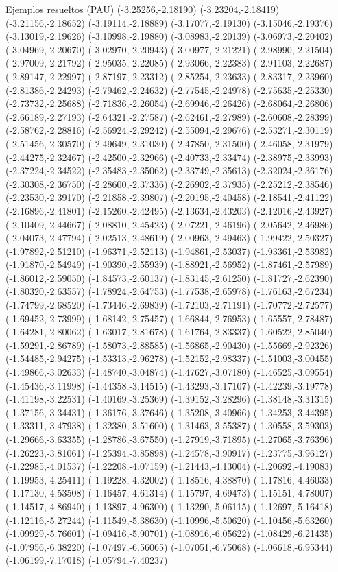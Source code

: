 \documentclass[11pt,a4paper]{article}
\begin{document}
\begin{fmex}{Ejemplos resueltos (PAU)}
(-3.25256,-2.18190) (-3.23204,-2.18419) (-3.21156,-2.18652) (-3.19114,-2.18889) (-3.17077,-2.19130) (-3.15046,-2.19376) (-3.13019,-2.19626) (-3.10998,-2.19880) (-3.08983,-2.20139) (-3.06973,-2.20402) (-3.04969,-2.20670) (-3.02970,-2.20943) (-3.00977,-2.21221) (-2.98990,-2.21504) (-2.97009,-2.21792) (-2.95035,-2.22085) (-2.93066,-2.22383) (-2.91103,-2.22687) (-2.89147,-2.22997) (-2.87197,-2.23312) (-2.85254,-2.23633) (-2.83317,-2.23960) (-2.81386,-2.24293) (-2.79462,-2.24632) (-2.77545,-2.24978) (-2.75635,-2.25330) (-2.73732,-2.25688) (-2.71836,-2.26054) (-2.69946,-2.26426) (-2.68064,-2.26806) (-2.66189,-2.27193) (-2.64321,-2.27587) (-2.62461,-2.27989) (-2.60608,-2.28399) (-2.58762,-2.28816) (-2.56924,-2.29242) (-2.55094,-2.29676) (-2.53271,-2.30119) (-2.51456,-2.30570) (-2.49649,-2.31030) (-2.47850,-2.31500) (-2.46058,-2.31979) (-2.44275,-2.32467) (-2.42500,-2.32966) (-2.40733,-2.33474) (-2.38975,-2.33993) (-2.37224,-2.34522) (-2.35483,-2.35062) (-2.33749,-2.35613) (-2.32024,-2.36176) (-2.30308,-2.36750) (-2.28600,-2.37336) (-2.26902,-2.37935) (-2.25212,-2.38546) (-2.23530,-2.39170) (-2.21858,-2.39807) (-2.20195,-2.40458) (-2.18541,-2.41122) (-2.16896,-2.41801) (-2.15260,-2.42495) (-2.13634,-2.43203) (-2.12016,-2.43927) (-2.10409,-2.44667) (-2.08810,-2.45423) (-2.07221,-2.46196) (-2.05642,-2.46986) (-2.04073,-2.47794) (-2.02513,-2.48619) (-2.00963,-2.49463) (-1.99422,-2.50327) (-1.97892,-2.51210) (-1.96371,-2.52113) (-1.94861,-2.53037) (-1.93361,-2.53982) (-1.91870,-2.54949) (-1.90390,-2.55939) (-1.88921,-2.56952) (-1.87461,-2.57989) (-1.86012,-2.59050) (-1.84573,-2.60137) (-1.83145,-2.61250) (-1.81727,-2.62390) (-1.80320,-2.63557) (-1.78924,-2.64753) (-1.77538,-2.65978) (-1.76163,-2.67234) (-1.74799,-2.68520) (-1.73446,-2.69839) (-1.72103,-2.71191) (-1.70772,-2.72577) (-1.69452,-2.73999) (-1.68142,-2.75457) (-1.66844,-2.76953) (-1.65557,-2.78487) (-1.64281,-2.80062) (-1.63017,-2.81678) (-1.61764,-2.83337) (-1.60522,-2.85040) (-1.59291,-2.86789) (-1.58073,-2.88585) (-1.56865,-2.90430) (-1.55669,-2.92326) (-1.54485,-2.94275) (-1.53313,-2.96278) (-1.52152,-2.98337) (-1.51003,-3.00455) (-1.49866,-3.02633) (-1.48740,-3.04874) (-1.47627,-3.07180) (-1.46525,-3.09554) (-1.45436,-3.11998) (-1.44358,-3.14515) (-1.43293,-3.17107) (-1.42239,-3.19778) (-1.41198,-3.22531) (-1.40169,-3.25369) (-1.39152,-3.28296) (-1.38148,-3.31315) (-1.37156,-3.34431) (-1.36176,-3.37646) (-1.35208,-3.40966) (-1.34253,-3.44395) (-1.33311,-3.47938) (-1.32380,-3.51600) (-1.31463,-3.55387) (-1.30558,-3.59303) (-1.29666,-3.63355) (-1.28786,-3.67550) (-1.27919,-3.71895) (-1.27065,-3.76396) (-1.26223,-3.81061) (-1.25394,-3.85898) (-1.24578,-3.90917) (-1.23775,-3.96127) (-1.22985,-4.01537) (-1.22208,-4.07159) (-1.21443,-4.13004) (-1.20692,-4.19083) (-1.19953,-4.25411) (-1.19228,-4.32002) (-1.18516,-4.38870) (-1.17816,-4.46033) (-1.17130,-4.53508) (-1.16457,-4.61314) (-1.15797,-4.69473) (-1.15151,-4.78007) (-1.14517,-4.86940) (-1.13897,-4.96300) (-1.13290,-5.06115) (-1.12697,-5.16418) (-1.12116,-5.27244) (-1.11549,-5.38630) (-1.10996,-5.50620) (-1.10456,-5.63260) (-1.09929,-5.76601) (-1.09416,-5.90701) (-1.08916,-6.05622) (-1.08429,-6.21435) (-1.07956,-6.38220) (-1.07497,-6.56065) (-1.07051,-6.75068) (-1.06618,-6.95344) (-1.06199,-7.17018) (-1.05794,-7.40237) 
\end{fmex}
\end{document}

